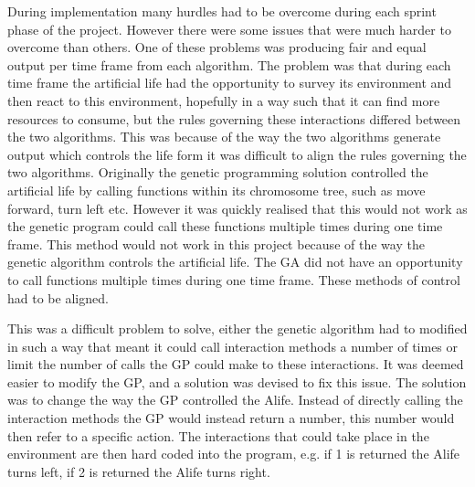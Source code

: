 \documentclass[12pt]{article}
\begin{document}
During implementation many hurdles had to be overcome during each sprint phase of the project. However there were some issues that were much harder to overcome than others. One of these problems was
producing fair and equal output per time frame from each algorithm. The problem was that during each time frame the artificial life had the opportunity to survey its environment and then react to this
environment, hopefully in a way such that it can find more resources to consume, but the rules governing these interactions differed between the two algorithms.
This was because of the way the two algorithms generate output which controls the life form it was difficult to align
the rules governing the two algorithms. Originally the genetic programming solution controlled the artificial life by calling functions within its chromosome tree, such as move forward, turn left etc.
However it was quickly realised that this would not work as the genetic program could call these functions multiple times during one time frame. This method would not work in this project because
of the way the genetic algorithm controls the artificial life. The GA did not have an opportunity to call functions multiple times during one time frame. These methods of control had to be aligned. 

This was a difficult problem to solve, either the genetic algorithm had to modified in such a way that meant it could call interaction methods
a number of times or limit the number of calls the GP could make to these interactions. It was deemed easier to modify the GP, and a solution
was devised to fix this issue. The solution was to change the way the GP controlled the Alife. Instead of directly calling the interaction methods
the GP would instead return a number, this number would then refer to a specific action. The interactions that could take place in 
the environment are then hard coded into the program, e.g. if 1 is returned the Alife turns left, if 2 is returned the Alife turns right.
\end{document}
